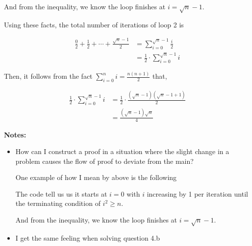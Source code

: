 \documentclass[12pt]{article}
\begin{document}
\begin{enumerate}[a.]
\begin{mdframed}
        \bigskip

        And from the inequality, we know the loop finishes at $i = \sqrt{n} - 1$.
        \color{black}

        \bigskip

        Using \color{red}these facts\color{black}, the total number of iterations of loop 2 is

        \color{red}
        \begin{align}
            \frac{0}{2} + \frac{1}{2} + \cdots + \frac{\sqrt{n} - 1}{2} &= \sum\limits_{i=0}^{\sqrt{n} - 1} \frac{i}{2}\\
            &= \frac{1}{2} \cdot \sum\limits_{i=0}^{\sqrt{n} - 1} i
        \end{align}

        \bigskip

        Then, it follows from the fact $\sum\limits_{i=0}^n i = \frac{n(n+1)}{2}$ that,

        \begin{align}
            \frac{1}{2} \cdot \sum\limits_{i=0}^{\sqrt{n}-1} i &= \frac{1}{2} \cdot \frac{(\sqrt{n}-1)(\sqrt{n}-1+1)}{2}\\
            &= \frac{(\sqrt{n}-1)\sqrt{n}}{4}
        \end{align}
        \color{black}

    \end{mdframed}

    \bigskip

    \textbf{Notes:}

    \begin{itemize}
        \item How can I construct a proof in a situation where the slight change in a problem
        causes the flow of proof to deviate from the main?

        \bigskip

        One example of how I mean by above is the following

        \begin{mdframed}
            The code tell us us it starts at $i = 0$ with \color{red}$i$ increasing by 1 per iteration
            until the terminating condition of $i^2 \geq n$.

            \bigskip

            And from the inequality, we know the loop finishes at $i = \sqrt{n} - 1$.
            \color{black}
        \end{mdframed}

        \item I get the same feeling when solving question 4.b
    \end{itemize}

\end{enumerate}
\end{document}
